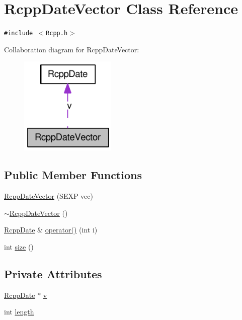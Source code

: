 \hypertarget{classRcppDateVector}{
\section{RcppDateVector Class Reference}
\label{classRcppDateVector}
}
{\tt \#include $<$Rcpp.h$>$}

Collaboration diagram for RcppDateVector:\nopagebreak
\begin{figure}[H]
\begin{center}
\leavevmode
\includegraphics[width=130pt]{classRcppDateVector__coll__graph}
\end{center}
\end{figure}
\subsection*{Public Member Functions}
\begin{CompactItemize}
\item 
\hyperlink{classRcppDateVector_65de4c0807f5c4b33429c8ebb5224831}{RcppDateVector} (SEXP vec)
\item 
\hyperlink{classRcppDateVector_ad0851f7555a09615ccb17bcb20fc7f1}{$\sim$RcppDateVector} ()
\item 
\hyperlink{classRcppDate}{RcppDate} \& \hyperlink{classRcppDateVector_7a6d9ceb233ed06f037013bdf4088a23}{operator()} (int i)
\item 
int \hyperlink{classRcppDateVector_03db4282da968eb4e0ae2a38375e0d37}{size} ()
\end{CompactItemize}
\subsection*{Private Attributes}
\begin{CompactItemize}
\item 
\hyperlink{classRcppDate}{RcppDate} $\ast$ \hyperlink{classRcppDateVector_faa34ebaf3d8bac309e81895c376f545}{v}
\item 
int \hyperlink{classRcppDateVector_a36764f68111a84b737b78600ff06433}{length}
\end{CompactItemize}


